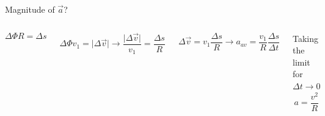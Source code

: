 \documentclass[]{beamer}
\begin{document}
\begin{frame}
\begin{columns}[c]
           
           
            
      
         \end{columns}
 
     
       \end{frame}









\begin{frame}

    Magnitude of $\vec{a}$?
   
    \begin{columns}[c]
         \column{2.3in}  %
   
        


         \begin{equation*}
            \Delta \Phi R =\Delta s 
           \end{equation*}
           
         
            \begin{equation*}
            \Delta \Phi v_1 =\vert \Delta  \vec{v} \vert \rightarrow \frac{\vert\Delta \vec{v}\vert}{v_1} =\frac{\Delta s}{R}
           \end{equation*}
  
         \begin{equation*}
           \Delta \vec{v} =v_1\frac{\Delta s}{R}\rightarrow a_{av}=\frac{v_1}{R}\frac{\Delta s}{\Delta t}
           \end{equation*}
           
           Taking the limit for ${\Delta t\to 0}$
            \begin{equation*}
          \boxed{a=\frac{v^2}{R}}
           \end{equation*} 
           
 
         \column{2.5in}
         

\end{columns}
\end{frame}
\end{document}
